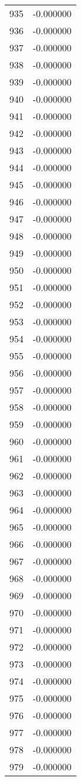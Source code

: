 \documentclass[12pt]{article}
\begin{document}
\begin{longtable}{@{}cc@{}}
935 & -0.000000 \\
936 & -0.000000 \\
937 & -0.000000 \\
938 & -0.000000 \\
939 & -0.000000 \\
940 & -0.000000 \\
941 & -0.000000 \\
942 & -0.000000 \\
943 & -0.000000 \\
944 & -0.000000 \\
945 & -0.000000 \\
946 & -0.000000 \\
947 & -0.000000 \\
948 & -0.000000 \\
949 & -0.000000 \\
950 & -0.000000 \\
951 & -0.000000 \\
952 & -0.000000 \\
953 & -0.000000 \\
954 & -0.000000 \\
955 & -0.000000 \\
956 & -0.000000 \\
957 & -0.000000 \\
958 & -0.000000 \\
959 & -0.000000 \\
960 & -0.000000 \\
961 & -0.000000 \\
962 & -0.000000 \\
963 & -0.000000 \\
964 & -0.000000 \\
965 & -0.000000 \\
966 & -0.000000 \\
967 & -0.000000 \\
968 & -0.000000 \\
969 & -0.000000 \\
970 & -0.000000 \\
971 & -0.000000 \\
972 & -0.000000 \\
973 & -0.000000 \\
974 & -0.000000 \\
975 & -0.000000 \\
976 & -0.000000 \\
977 & -0.000000 \\
978 & -0.000000 \\
979 & -0.000000 \\

\end{longtable}
\end{document}
